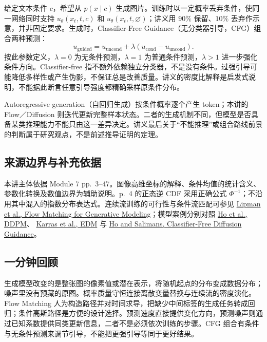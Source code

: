 
给定文本条件 $c$，希望从 $p(x\mid c)$ 生成图片。训练时以一定概率丢弃条件，使同一网络同时支持 $u_\theta(x_t,t,c)$ 和 $u_\theta(x_t,t,\varnothing)$；讲义用 $90\%$ 保留、$10\%$ 丢弃作示意，并非固定要求。生成时，Classifier-Free Guidance（无分类器引导，CFG）组合两种预测：
\[
  \boxed{u_{\mathrm{guided}}=u_{\mathrm{uncond}}+
    \lambda(u_{\mathrm{cond}}-u_{\mathrm{uncond}})}.
\]
按此参数定义，$\lambda=0$ 为无条件预测，$\lambda=1$ 为普通条件预测，$\lambda>1$ 进一步强化条件方向。Classifier-free 指不额外依赖独立分类器，不是没有条件。过强引导可能降低多样性或产生伪影，不保证总是改善质量。讲义的密度比解释是启发式说明，不能据此断言任意引导强度都精确采样原条件分布。

Autoregressive generation（自回归生成）按条件概率逐个产生 token；本讲的 Flow／Diffusion 则迭代更新完整样本状态。二者的生成机制不同，但模型是否具备某类推理能力不能只由这一差异决定。讲义最后关于“不能推理”或组合路线前景的判断属于研究观点，不是前述推导证明的定理。

\subsection{来源边界与补充依据}

本讲主体依据 Module 7 pp.~3--47。图像高维坐标的解释、条件均值的统计含义、参数化转换及数值边界为辅助说明。p.~4 的正态逆 CDF 采用正确公式 $\Phi^{-1}$；不沿用其中混入的指数分布表达式。连续流训练的可行性与条件流匹配可参见
\href{https://arxiv.org/abs/2210.02747}{Lipman et al., Flow Matching for Generative Modeling}；模型案例分别对照
\href{https://arxiv.org/abs/2006.11239}{Ho et al., DDPM}、
\href{https://arxiv.org/abs/2206.00364}{Karras et al., EDM} 与
\href{https://arxiv.org/abs/2207.12598}{Ho and Salimans, Classifier-Free Diffusion Guidance}。

\subsection{一分钟回顾}

生成模型改变的是整张图的像素值或潜在表示，将随机起点的分布变成数据分布；噪声里没有预藏的原图。概率质量守恒连接离散变量替换与连续流的密度演化。Flow Matching 人为构造路径并对时间求导，把缺少中间标签的生成任务转成回归；条件高斯路径是方便的设计选择。预测速度直接提供变化方向，预测噪声则通过已知系数提供同类更新信息，二者不是必须依次训练的步骤。CFG 组合有条件与无条件预测来调节引导，不能把更强引导等同于更好结果。
